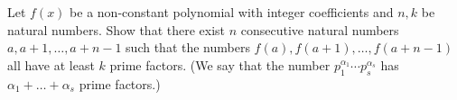 Let $f(x)$ be a non-constant polynomial with integer coefficients and $n,k$ be natural numbers. Show that there exist $n$ consecutive natural numbers $a,a+1,\ldots,a+n-1$ such that the numbers $f(a),f(a+1),\ldots,f(a+n-1)$ all have at least $k$ prime factors. (We say that the number $p_1^{\alpha_1}\cdots p_s^{\alpha_s}$ has $\alpha_1+\ldots+\alpha_s$ prime factors.)